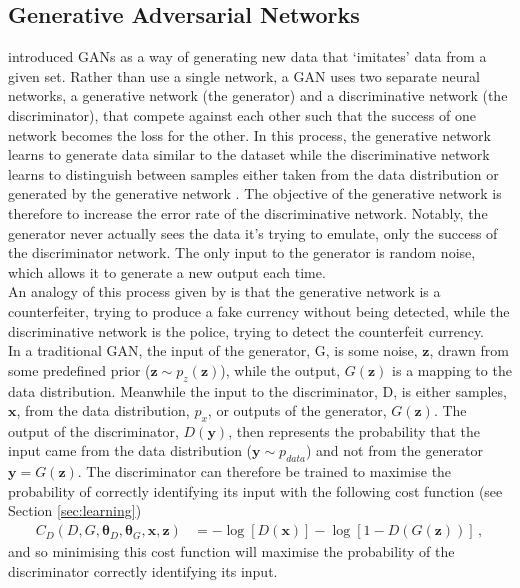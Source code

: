 \documentclass[11pt,a4paper,onecolumn]{report}
\begin{document}
\subsection{Generative Adversarial Networks}
\label{sec:gan}
\citet{Goodfellow2014} introduced GANs as a way of generating
new data that `imitates' data from a given set. Rather than use a single
network, a GAN uses two separate neural networks, a generative network (the
generator) and a discriminative network (the discriminator), that compete
against each other such that the success of one network becomes the loss for the
other. In this process, the generative network learns to generate data similar
to the dataset while the discriminative network learns to distinguish between
samples either taken from the data distribution or generated by the generative
network \citep{Goodfellow2014}. The objective of the generative network is
therefore to increase the error rate of the discriminative network. Notably, the
generator never actually sees the data it's trying to emulate, only the success
of the discriminator network. The only input to the generator is random noise,
which allows it to generate a new output each time. \\

An analogy of this process given by \citet{Goodfellow2014} is that the generative
network is a counterfeiter, trying to produce a fake currency without being
detected, while the discriminative network is the police, trying to detect the
counterfeit currency.\\

In a traditional GAN, the input of the generator, G, is some noise, \(\bm{z}\),
drawn from some predefined prior (\(\bm{z} \sim  p_z(\bm{z})\)), while
the output, \(G(\bm{z})\) is a mapping to the data distribution. Meanwhile the
input to the discriminator, D, is either samples, \(\bm{x}\), from the data
distribution, \(p_x\), or outputs of the generator, \(G(\bm{z})\). The output of
the discriminator, \(D(\bm{y})\), then represents the probability that the input
came from the data distribution (\( \bm{y} \sim p_{data}\)) and not from the
generator \(\bm{y} = G(\bm{z})\). The discriminator can therefore be trained to
maximise the probability of correctly identifying its input with the
following cost function (see Section \ref{sec:learning})
\begin{align}
  C_D(D, G, \bm{\theta}_D, \bm{\theta}_G, \bm{x}, \bm{z}) &=
  -\log[D(\bm{x})] - \log[1 - D(G(\bm{z}))]\,,
\end{align}
and so minimising this cost function will maximise the probability of the
discriminator correctly identifying its input.\\
\end{document}
